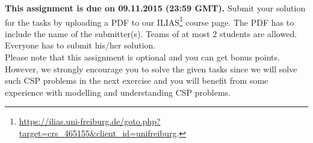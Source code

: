 \documentclass{exam}
\begin{document}
\noindent
{\bf This assignment is due on 09.11.2015 (23:59 GMT).} Submit your solution for the tasks by uploading a PDF to our ILIAS\footnote{ \url{https://ilias.uni-freiburg.de/goto.php?target=crs_465155&client_id=unifreiburg}.} course page. The PDF has to include the name of the submitter(s). Teams of at most $2$ students are allowed. Everyone has to submit his/her solution.\\

Please note that this assignment is optional and you can get bonus points. However, we strongly encourage you to solve the given tasks since we will solve such CSP problems in the next exercise and you will benefit from some experience with modelling and understanding CSP problems. 

\end{document}
